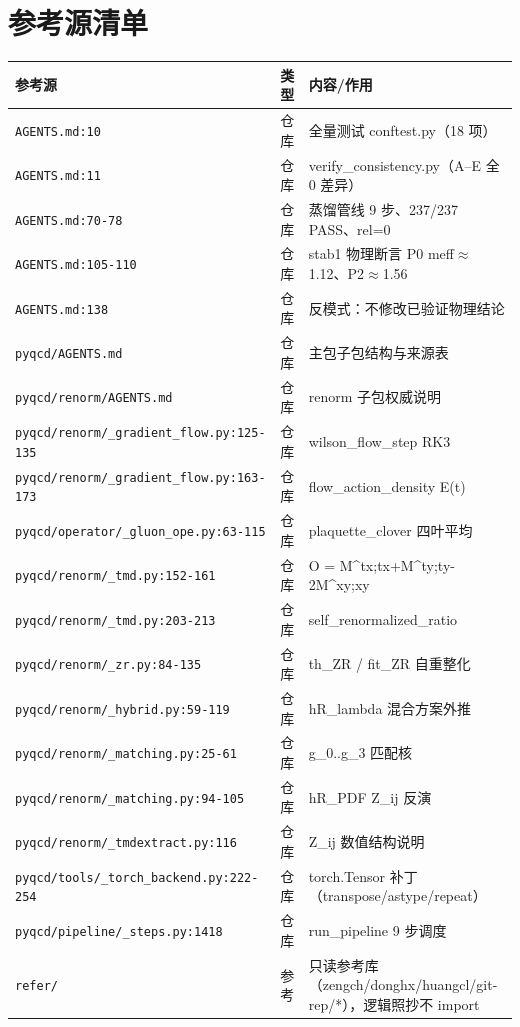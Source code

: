 \documentclass[UTF8]{ctexart}
\begin{document}
\section{参考源清单}
\begin{xltabular}{\textwidth}{llX}
\toprule
\textcolor{evidence}{参考源} & 类型 & 内容/作用 \\
\midrule
\endhead
\texttt{\nolinkurl{AGENTS.md:10}} & 仓库 & 全量测试 conftest.py（18 项） \\
\texttt{\nolinkurl{AGENTS.md:11}} & 仓库 & verify\_consistency.py（A–E 全 0 差异） \\
\texttt{\nolinkurl{AGENTS.md:70-78}} & 仓库 & 蒸馏管线 9 步、237/237 PASS、rel=0 \\
\texttt{\nolinkurl{AGENTS.md:105-110}} & 仓库 & stab1 物理断言 P0 meff$\approx$1.12、P2$\approx$1.56 \\
\texttt{\nolinkurl{AGENTS.md:138}} & 仓库 & 反模式：不修改已验证物理结论 \\
\texttt{\nolinkurl{pyqcd/AGENTS.md}} & 仓库 & 主包子包结构与来源表 \\
\texttt{\nolinkurl{pyqcd/renorm/AGENTS.md}} & 仓库 & renorm 子包权威说明 \\
\texttt{\nolinkurl{pyqcd/renorm/_gradient_flow.py:125-135}} & 仓库 & wilson\_flow\_step RK3 \\
\texttt{\nolinkurl{pyqcd/renorm/_gradient_flow.py:163-173}} & 仓库 & flow\_action\_density E(t) \\
\texttt{\nolinkurl{pyqcd/operator/_gluon_ope.py:63-115}} & 仓库 & plaquette\_clover 四叶平均 \\
\texttt{\nolinkurl{pyqcd/renorm/_tmd.py:152-161}} & 仓库 & O = M\^{}tx;tx+M\^{}ty;ty-2M\^{}xy;xy \\
\texttt{\nolinkurl{pyqcd/renorm/_tmd.py:203-213}} & 仓库 & self\_renormalized\_ratio \\
\texttt{\nolinkurl{pyqcd/renorm/_zr.py:84-135}} & 仓库 & th\_ZR / fit\_ZR 自重整化 \\
\texttt{\nolinkurl{pyqcd/renorm/_hybrid.py:59-119}} & 仓库 & hR\_lambda 混合方案外推 \\
\texttt{\nolinkurl{pyqcd/renorm/_matching.py:25-61}} & 仓库 & g\_0..g\_3 匹配核 \\
\texttt{\nolinkurl{pyqcd/renorm/_matching.py:94-105}} & 仓库 & hR\_PDF Z\_ij 反演 \\
\texttt{\nolinkurl{pyqcd/renorm/_tmdextract.py:116}} & 仓库 & Z\_ij 数值结构说明 \\
\texttt{\nolinkurl{pyqcd/tools/_torch_backend.py:222-254}} & 仓库 & torch.Tensor 补丁（transpose/astype/repeat） \\
\texttt{\nolinkurl{pyqcd/pipeline/_steps.py:1418}} & 仓库 & run\_pipeline 9 步调度 \\
\texttt{\nolinkurl{refer/}} & 参考 & 只读参考库（zengch/donghx/huangcl/git-rep/*），逻辑照抄不 import \\
\bottomrule
\end{xltabular}
\end{document}

